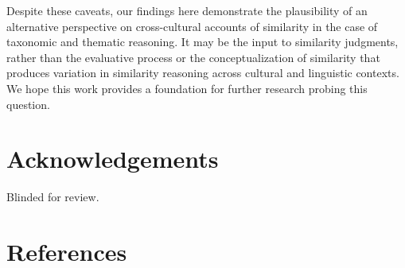 \documentclass[10pt, letterpaper]{article}
\begin{document}
Despite these caveats, our findings here demonstrate the plausibility of
an alternative perspective on cross-cultural accounts of similarity in
the case of taxonomic and thematic reasoning. It may be the input to
similarity judgments, rather than the evaluative process or the
conceptualization of similarity that produces variation in similarity
reasoning across cultural and linguistic contexts. We hope this work
provides a foundation for further research probing this question.

\hypertarget{acknowledgements}{%
\section{Acknowledgements}\label{acknowledgements}}

Blinded for review.

\hypertarget{references}{%
\section{References}\label{references}}

\setlength{\parindent}{-0.1in} 
\setlength{\leftskip}{0.125in}

\noindent
\end{document}
